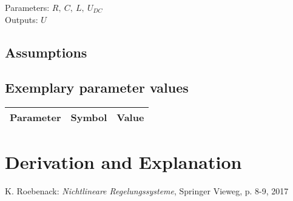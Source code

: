 \documentclass[10pt,a4paper]{article}
\begin{document}
	
	\noindent
	Parameters: $R, ~C, ~L, ~U_{DC}$ %
	\\
	Outputs: $U$ %
	
	
	\subsection{Assumptions} %

	
	
	\subsection{Exemplary parameter values}
	\begin{tabular}{lcl} 
		Parameter & Symbol & Value \\ \hline	
	\end{tabular}

	
	\section{Derivation and Explanation} %
	
	
	\begin{thebibliography}{10}		
		K. Roebenack: 
		\textit{Nichtlineare Regelungssysteme}, Springer Vieweg, p. 8-9, 2017
	\end{thebibliography}
\end{document}
